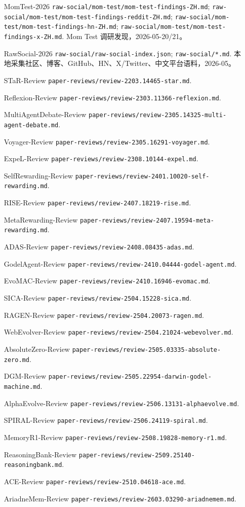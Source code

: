 \begin{itemize}[nosep]
\item [MomTest-2026] \texttt{raw-social/mom-test/mom-test-findings-ZH.md}; \texttt{raw-social/mom-test/mom-test-findings-reddit-ZH.md}; \texttt{raw-social/mom-test/mom-test-findings-hn-ZH.md}; \texttt{raw-social/mom-test/mom-test-findings-x-ZH.md}. Mom Test 调研发现，2026-05-20/21。
\item [RawSocial-2026] \texttt{raw-social/raw-social-index.json}; \texttt{raw-social/*.md}. 本地采集社区、博客、GitHub、HN、X/Twitter、中文平台语料，2026-05。
\item [STaR-Review] \texttt{paper-reviews/review-2203.14465-star.md}.
\item [Reflexion-Review] \texttt{paper-reviews/review-2303.11366-reflexion.md}.
\item [MultiAgentDebate-Review] \texttt{paper-reviews/review-2305.14325-multi-agent-debate.md}.
\item [Voyager-Review] \texttt{paper-reviews/review-2305.16291-voyager.md}.
\item [ExpeL-Review] \texttt{paper-reviews/review-2308.10144-expel.md}.
\item [SelfRewarding-Review] \texttt{paper-reviews/review-2401.10020-self-rewarding.md}.
\item [RISE-Review] \texttt{paper-reviews/review-2407.18219-rise.md}.
\item [MetaRewarding-Review] \texttt{paper-reviews/review-2407.19594-meta-rewarding.md}.
\item [ADAS-Review] \texttt{paper-reviews/review-2408.08435-adas.md}.
\item [GodelAgent-Review] \texttt{paper-reviews/review-2410.04444-godel-agent.md}.
\item [EvoMAC-Review] \texttt{paper-reviews/review-2410.16946-evomac.md}.
\item [SICA-Review] \texttt{paper-reviews/review-2504.15228-sica.md}.
\item [RAGEN-Review] \texttt{paper-reviews/review-2504.20073-ragen.md}.
\item [WebEvolver-Review] \texttt{paper-reviews/review-2504.21024-webevolver.md}.
\item [AbsoluteZero-Review] \texttt{paper-reviews/review-2505.03335-absolute-zero.md}.
\item [DGM-Review] \texttt{paper-reviews/review-2505.22954-darwin-godel-machine.md}.
\item [AlphaEvolve-Review] \texttt{paper-reviews/review-2506.13131-alphaevolve.md}.
\item [SPIRAL-Review] \texttt{paper-reviews/review-2506.24119-spiral.md}.
\item [MemoryR1-Review] \texttt{paper-reviews/review-2508.19828-memory-r1.md}.
\item [ReasoningBank-Review] \texttt{paper-reviews/review-2509.25140-reasoningbank.md}.
\item [ACE-Review] \texttt{paper-reviews/review-2510.04618-ace.md}.
\item [AriadneMem-Review] \texttt{paper-reviews/review-2603.03290-ariadnemem.md}.
\end{itemize}
